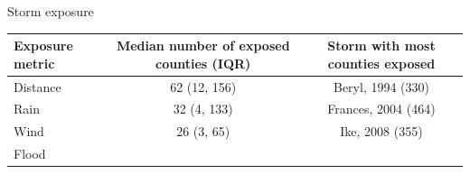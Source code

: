 \documentclass[ignorenonframetext,]{beamer}
\begin{document}
\begin{frame}{Storm exposure}

\begin{longtable}[]{@{}lcc@{}}
\toprule
\begin{minipage}[b]{0.23\columnwidth}\raggedright\strut
Exposure metric\strut
\end{minipage} & \begin{minipage}[b]{0.34\columnwidth}\centering\strut
Median number of exposed counties (IQR)\strut
\end{minipage} & \begin{minipage}[b]{0.34\columnwidth}\centering\strut
Storm with most counties exposed\strut
\end{minipage}\tabularnewline
\midrule
\endhead
\begin{minipage}[t]{0.23\columnwidth}\raggedright\strut
Distance\strut
\end{minipage} & \begin{minipage}[t]{0.34\columnwidth}\centering\strut
62 (12, 156)\strut
\end{minipage} & \begin{minipage}[t]{0.34\columnwidth}\centering\strut
Beryl, 1994 (330)\strut
\end{minipage}\tabularnewline
\begin{minipage}[t]{0.23\columnwidth}\raggedright\strut
Rain\strut
\end{minipage} & \begin{minipage}[t]{0.34\columnwidth}\centering\strut
32 (4, 133)\strut
\end{minipage} & \begin{minipage}[t]{0.34\columnwidth}\centering\strut
Frances, 2004 (464)\strut
\end{minipage}\tabularnewline
\begin{minipage}[t]{0.23\columnwidth}\raggedright\strut
Wind\strut
\end{minipage} & \begin{minipage}[t]{0.34\columnwidth}\centering\strut
26 (3, 65)\strut
\end{minipage} & \begin{minipage}[t]{0.34\columnwidth}\centering\strut
Ike, 2008 (355)\strut
\end{minipage}\tabularnewline
\begin{minipage}[t]{0.23\columnwidth}\raggedright\strut
Flood\strut
\end{minipage} & \begin{minipage}[t]{0.34\columnwidth}\centering\strut

\end{minipage}
\end{longtable}
\end{frame}
\end{document}
